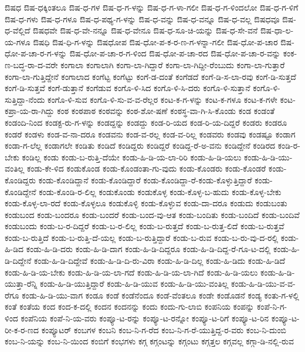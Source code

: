 {ಔಷಧ
ಔಷ-ಧಕ್ಕಿಂತಲೂ
ಔಷ-ಧ-ಗಳ
ಔಷ-ಧ-ಗ-ಳನ್ನು
ಔಷ-ಧ-ಗ-ಳಾ-ಗಲೀ
ಔಷ-ಧ-ಗ-ಳಿಂದಲೋ
ಔಷ-ಧ-ಗ-ಳಿಗೆ
ಔಷ-ಧ-ಗಳು
ಔಷ-ಧ-ಗಳೂ
ಔಷ-ಧ-ಪಥ್ಯ-ಗ-ಳನ್ನು
ಔಷ-ಧ-ವನ್ನು
ಔಷ-ಧ-ವನ್ನೂ
ಔಷ-ಧ-ವಲ್ಲ
ಔಷಧವೂ
ಔಷ-ಧ-ವೆಲ್ಲಿದೆ
ಔಷಧವೇ
ಔಷ-ಧ-ವೇ-ನನ್ನೂ
ಔಷ-ಧ-ವೇನೂ
ಔಷ-ಧ-ಸೂ-ಚಿ-ಯನ್ನು
ಔಷ-ಧ-ಸೇ-ವನೆ
ಔಷ-ಧಾ-ಲ-ಯ-ಗಳೂ
ಔಷಧಿ
ಔಷ-ಧಿ-ಗ-ಳನ್ನು
ಔಷಧೋಪ
ಔಷ-ಧೋ-ಪ-ಕ-ರ-ಣ-ಗ-ಳನ್ನಾ-ಗಲೀ
ಔಷ-ಧೋ-ಪ-ಚಾರ
ಔಷ-ಧೋ-ಪ-ಚಾ-ರ-ಗ-ಳನ್ನು
ಔಷ-ಧೋ-ಪ-ಚಾ-ರ-ಗ-ಳಿಂದ
ಔಷ-ಧೋ-ಪ-ಚಾ-ರದ
ಔಷ-ಧೋ-ಪ-ಚಾ-ರ-ವನ್ನು
ಕಂಕ-ಣ-ಬದ್ಧ-ರಾ-ದ-ವರೇ
ಕಂಗಾಲಾ
ಕಂಗಾಲಾಗಿ
ಕಂಗಾ-ಲಾ-ಗಿದ್ದಾರೆ
ಕಂಗಾ-ಲಾ-ಗಿದ್ದೀ-ರೆಂಬುದು
ಕಂಗಾ-ಲಾ-ಗುತ್ತಾರೆ
ಕಂಗಾ-ಲಾ-ಗುತ್ತಿದ್ದೇನೆ
ಕಂಗಾಲಾದ
ಕಂಗೆಟ್ಟ
ಕಂಗೆಟ್ಟು
ಕಂಗೆ-ಡ-ದಂತೆ
ಕಂಗೆಡದೆ
ಕಂಗೆ-ಡಿ-ಸ-ಲಾ-ರವು
ಕಂಗೆ-ಡಿ-ಸುತ್ತದೆ
ಕಂಗೆ-ಡಿ-ಸುತ್ತವೆ
ಕಂಗೆ-ಡುತ್ತಾನೆ
ಕಂಗೆಡುವ
ಕಂಗೊ-ಳಿ-ಸಿದ
ಕಂಗೊ-ಳಿ-ಸಿ-ದರು
ಕಂಗೊ-ಳಿ-ಸುತ್ತಾನೆ
ಕಂಗೊ-ಳಿ-ಸುತ್ತಿದ್ದಾ-ನೆಂದು
ಕಂಗೊ-ಳಿ-ಸುವ
ಕಂಗೊ-ಳಿ-ಸು-ವ-ವ-ರೆಲ್ಲರ
ಕಂಟ-ಕ-ಗ-ಳನ್ನು
ಕಂಟ-ಕ-ಗಳೂ
ಕಂಟ-ಕ-ಗಳೇ
ಕಂಟ-ಕಪ್ರಾ-ಯ-ರಾ-ಗಿದ್ದು
ಕಂಠ
ಕಂಠಪಾಠ
ಕಂಠವನ್ನು
ಕಂಠ-ಶೋ-ಷಣೆ
ಕಂಠಸ್ಥ-ವಾ-ಗಿ-ಸಿ-ಕೊಂಡು
ಕಂಡ
ಕಂಡಂತೆ
ಕಂಡಂದಿ-ನಿಂದ
ಕಂಡಕ್ಟ-ರು-ಗ-ಳನ್ನು
ಕಂಡದ್ದನ್ನು
ಕಂಡದ್ದು
ಕಂಡ-ರಿ-ಯದ
ಕಂಡ-ರಿ-ಯ-ದಿದ್ದರೆ
ಕಂಡರು
ಕಂಡರೂ
ಕಂಡರೆ
ಕಂಡಳು
ಕಂಡ-ವ-ನಾ-ದರೂ
ಕಂಡವನು
ಕಂಡ-ವ-ರಲ್ಲ
ಕಂಡ-ವ-ರಿಲ್ಲ
ಕಂಡವರು
ಕಂಡವು
ಕಂಡಷ್ಟೂ
ಕಂಡಾಗ
ಕಂಡಾ-ಗ-ಲೆಲ್ಲ
ಕಂಡಾಗಲೇ
ಕಂಡಿತು
ಕಂಡಿದೆ
ಕಂಡಿದ್ದರು
ಕಂಡಿದ್ದರೆ
ಕಂಡಿದ್ದ-ರೆ-ಅ-ವನು
ಕಂಡಿದ್ದೇನೆ
ಕಂಡಿರದ
ಕಂಡಿ-ರ-ಬೇಕು
ಕಂಡಿಲ್ಲ
ಕಂಡು
ಕಂಡು-ಬ-ರುತ್ತಿ-ದೆಯೇ
ಕಂಡು-ಹಿ-ಡಿ-ಯ-ಲಾ-ರಿರಿ
ಕಂಡು-ಹಿ-ಡಿ-ಯಲು
ಕಂಡು-ಹಿ-ಡಿ-ಯು-ವಂತಿಲ್ಲ
ಕಂಡು-ಕೇ-ಳಿದ
ಕಂಡುಕೊಂಡ
ಕಂಡು-ಕೊಂಡಂತಾ-ಗು-ವುದು
ಕಂಡು-ಕೊಂಡರು
ಕಂಡು-ಕೊಂಡರೆ
ಕಂಡು-ಕೊಂಡಿದ್ದರು
ಕಂಡು-ಕೊಂಡಿದ್ದಾನೆ
ಕಂಡು-ಕೊಂಡಿದ್ದಾರೆ
ಕಂಡು-ಕೊಂಡಿದ್ದಾ-ರೆ-ಕಂಡು-ಕೊಳ್ಳುತ್ತಿದ್ದಾರೆ
ಕಂಡು-ಕೊಂಡಿದ್ದೇನೆ
ಕಂಡು-ಕೊಂಡಿ-ರ-ಲಿಲ್ಲ
ಕಂಡುಕೊಂಡು
ಕಂಡುಕೊಳ್ಳ
ಕಂಡು-ಕೊಳ್ಳ-ಬ-ಹುದು
ಕಂಡು-ಕೊಳ್ಳ-ಬೇಕು
ಕಂಡು-ಕೊಳ್ಳ-ಲಾ-ರದೆ
ಕಂಡು-ಕೊಳ್ಳಲೂ
ಕಂಡುಕೊಳ್ಳಿ
ಕಂಡು-ಕೊಳ್ಳುವ
ಕಂಡು-ದಾ-ದರೂ
ಕಂಡುದು
ಕಂಡುಬಂತು
ಕಂಡುಬಂದ
ಕಂಡು-ಬಂದರೂ
ಕಂಡು-ಬಂದರೆ
ಕಂಡು-ಬಂದ-ವು-ಆತ
ಕಂಡು-ಬಂದಿತು
ಕಂಡು-ಬಂದಿದೆ
ಕಂಡು-ಬಂದಿವೆ
ಕಂಡುಬಂದು
ಕಂಡು-ಬ-ರ-ದಿದ್ದರೆ
ಕಂಡು-ಬ-ರ-ಲಿಲ್ಲ
ಕಂಡು-ಬ-ರುತ್ತದೆ
ಕಂಡು-ಬ-ರುತ್ತ-ಲಿದೆ
ಕಂಡು-ಬ-ರುತ್ತವೆ
ಕಂಡು-ಬ-ರುತ್ತಿದೆ
ಕಂಡು-ಬ-ರುತ್ತಿ-ದೆ-ಯಲ್ಲ
ಕಂಡು-ಬ-ರುತ್ತಿದ್ದಾರೆ
ಕಂಡು-ಬ-ರುವ
ಕಂಡು-ಬ-ರು-ವು-ದ-ರಲ್ಲಿ
ಕಂಡು-ಹಿ-ಡಿದ
ಕಂಡು-ಹಿ-ಡಿ-ದರು
ಕಂಡು-ಹಿ-ಡಿ-ದಾಗ
ಕಂಡು-ಹಿ-ಡಿ-ದಿದ್ದರೂ
ಕಂಡು-ಹಿ-ಡಿ-ದಿದ್ದ-ರೆ-ಗೂ-ಟ-ದಲ್ಲಿ
ಕಂಡು-ಹಿ-ಡಿ-ದಿದ್ದೇನೆ
ಕಂಡು-ಹಿ-ಡಿ-ದಿದ್ದೇವೆ
ಕಂಡು-ಹಿ-ಡಿ-ದಿ-ರು-ವಿರಾ
ಕಂಡು-ಹಿ-ಡಿ-ದಿಲ್ಲ
ಕಂಡು-ಹಿ-ಡಿದು
ಕಂಡು-ಹಿ-ಡಿದೆ
ಕಂಡು-ಹಿ-ಡಿ-ಯ-ಬೇಕು
ಕಂಡು-ಹಿ-ಡಿ-ಯ-ಲಾ-ಗದೆ
ಕಂಡು-ಹಿ-ಡಿ-ಯ-ಲಾ-ಗಿದೆ
ಕಂಡು-ಹಿ-ಡಿ-ಯಲು
ಕಂಡು-ಹಿ-ಡಿ-ಯುತ್ತಾ-ರೆನ್ನಿ
ಕಂಡು-ಹಿ-ಡಿ-ಯುತ್ತಿದ್ದಾರೆ
ಕಂಡು-ಹಿ-ಡಿ-ಯುವ
ಕಂಡು-ಹಿ-ಡಿ-ಯು-ವಂತಿಲ್ಲ
ಕಂಡು-ಹಿ-ಡಿ-ಯು-ವ-ವ-ರೆಗೂ
ಕಂಡು-ಹಿ-ಡಿ-ಯು-ವಾಗ
ಕಂಡೂ
ಕಂಡೆ
ಕಂಡೆನೆಂದೂ
ಕಂಡೆ-ವೆಂತಲೂ
ಕಂಡೇ
ಕಂಡೊಡನೆ
ಕಂಡ್ಯ
ಕಂತು-ಗ-ಳಲ್ಲಿ
ಕಂತೆ
ಕಂತೆಯ
ಕಂದ
ಕಂದ-ಕ-ದಲ್ಲಿ
ಕಂದನ
ಕಂದನನ್ನು
ಕಂದು
ಕಂದು-ಗು-ಲಾಬಿ
ಕಂಪನಿಯ
ಕಂಪನ್ನು
ಕಂಪೆ-ನಿ-ಗ-ಳಿಂದ
ಕಂಪೆನಿಯ
ಕಂಪೆ-ನಿ-ಯ-ವರು
ಕಂಪ್ಯೂ-ಟ-ರನ್ನು
ಕಂಪ್ಯೂ-ಟ-ರನ್ನೋ
ಕಂಪ್ಯೂ-ಟ-ರಿಗೆ
ಕಂಪ್ಯೂ-ಟ-ರಿನ
ಕಂಪ್ಯೂ-ಟ-ರೀ-ಕ-ರ-ಣದ
ಕಂಪ್ಯೂಟರ್
ಕಂಬಗಳ
ಕಂಬನಿ
ಕಂಬ-ನಿ-ಗ-ರೆದ
ಕಂಬ-ನಿ-ಗ-ರೆ-ಯುತ್ತಿದ್ದ-ರ-ವರು
ಕಂಬ-ನಿ-ದುಂಬಿ
ಕಂಬ-ನಿ-ಯನ್ನು
ಕಂಬ-ನಿ-ಯಿಂದ
ಕಂಬಿಗೆ
ಕಂಭಗಳು
ಕಗ್ಗ
ಕಗ್ಗಂಟನ್ನು
ಕಗ್ಗಂಟು
ಕಗ್ಗತ್ತಲ
ಕಗ್ಗವಲ್ಲ
ಕಗ್ಗಾ-ಡಿ-ನಲ್ಲಿ-ರುವ
}
